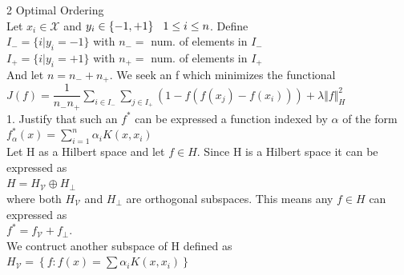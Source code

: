 \documentclass[18pt]{article}
\author{Adam Handwerger}
\begin{document}
\begin{flushleft}
2 Optimal Ordering\\
\vspace{.4cm}
Let $x_i \in \mathcal{X}$ and $y_i \in \{-1,+1\} \hspace{.3cm} 1 \leq i\leq n $. Define\\
\vspace{.4cm}
\hspace{3cm} $I_-=\{i | y_i=-1\}$ with $n_{-}=$ num. of elements in $I_-$\\
\hspace{3cm} $I_+=\{i | y_i=+1\}$ with $n_{+}=$ num. of elements in $I_+$\\
\vspace{.4cm}
And let $n=n_-+n_+$. We seek an f which minimizes the functional\\
\vspace{.4cm}
\hspace{2cm} $J(f)=\dfrac{1}{n_- n_+} \sum\limits_{i \in I_-}\sum\limits_{j \in I_+}(1-f(f(x_j)-f(x_i)))+\lambda \Vert f \Vert^2_H$\\
\vspace{.4cm}
1. Justify that such an $f^*$ can be expressed a function indexed by $\alpha$ of the form\\
\vspace{.4cm}
\hspace{4cm} $f_\alpha^*(x)=\sum\limits_{i=1}^n \alpha_i K(x,x_i)$\\
\vspace{.4cm}
Let H as a Hilbert space and let $f\in H.$ Since H is a Hilbert space it can be expressed as\\
\vspace{.4cm}
\hspace{4cm} $H=H_\mathcal{V}\oplus H_{\perp}$\\
\vspace{.4cm}
where both $H_\mathcal{V}$ and $H_{\perp}$ are orthogonal subspaces. This means any $f \in H$ can expressed as\\
\vspace{.4cm}
\hspace{4cm} $f^*=f_\mathcal{V}+f_{\perp}$.\\
\vspace{.4cm}
We contruct another subspace of H defined as\\
\vspace{.4cm}
\hspace{3cm} $H_\mathcal{V} =\left\{ f : f(x)=\sum \alpha_i K(x,x_i) \right\}$\\

\end{flushleft}
\end{document}
